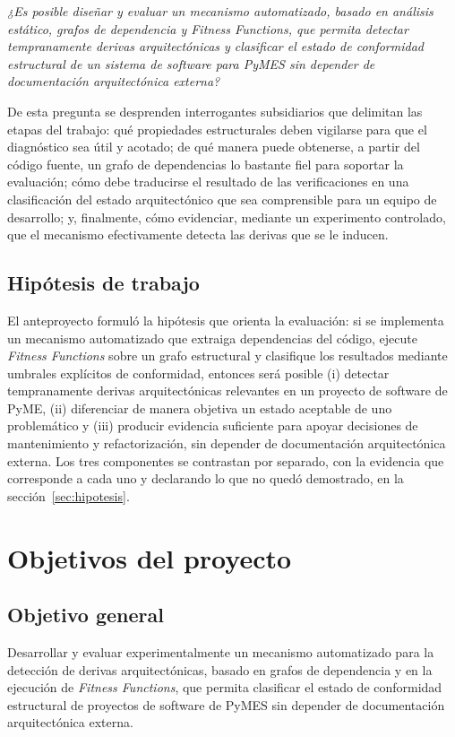 \textit{¿Es posible diseñar y evaluar un mecanismo automatizado, basado en análisis estático, grafos de dependencia y \textit{Fitness Functions}, que permita detectar tempranamente derivas arquitectónicas y clasificar el estado de conformidad estructural de un sistema de software para PyMES sin depender de documentación arquitectónica externa?}

De esta pregunta se desprenden interrogantes subsidiarios que delimitan las etapas del trabajo: qué propiedades estructurales deben vigilarse para que el diagnóstico sea útil y acotado; de qué manera puede obtenerse, a partir del código fuente, un grafo de dependencias lo bastante fiel para soportar la evaluación; cómo debe traducirse el resultado de las verificaciones en una clasificación del estado arquitectónico que sea comprensible para un equipo de desarrollo; y, finalmente, cómo evidenciar, mediante un experimento controlado, que el mecanismo efectivamente detecta las derivas que se le inducen.

\subsection{Hipótesis de trabajo}
\label{sec:hipotesis-intro}
El anteproyecto formuló la hipótesis que orienta la evaluación: si se implementa un mecanismo automatizado que extraiga dependencias del código, ejecute \textit{Fitness Functions} sobre un grafo estructural y clasifique los resultados mediante umbrales explícitos de conformidad, entonces será posible (i) detectar tempranamente derivas arquitectónicas relevantes en un proyecto de software de PyME, (ii) diferenciar de manera objetiva un estado aceptable de uno problemático y (iii) producir evidencia suficiente para apoyar decisiones de mantenimiento y refactorización, sin depender de documentación arquitectónica externa. Los tres componentes se contrastan por separado, con la evidencia que corresponde a cada uno y declarando lo que no quedó demostrado, en la sección~\ref{sec:hipotesis}.

\section{Objetivos del proyecto}

\subsection{Objetivo general}
Desarrollar y evaluar experimentalmente un mecanismo automatizado para la detección de derivas arquitectónicas, basado en grafos de dependencia y en la ejecución de \textit{Fitness Functions}, que permita clasificar el estado de conformidad estructural de proyectos de software de PyMES sin depender de documentación arquitectónica externa.

